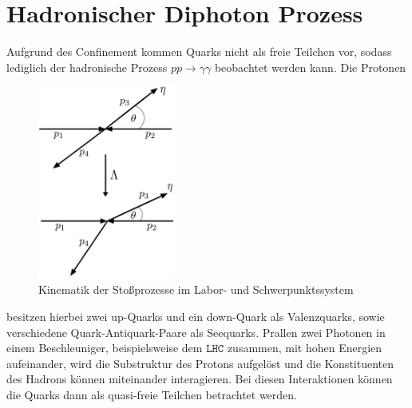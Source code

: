 \section{Hadronischer Diphoton Prozess}
Aufgrund des Confinement kommen Quarks nicht als freie Teilchen vor, sodass lediglich der hadronische Prozess $pp \rightarrow \gamma \gamma$ beobachtet werden kann.  Die Protonen 
\begin{figure}
	\includegraphics[width=45mm]{graphics/Kinematik}
	\caption{Kinematik der Stoßprozesse im Labor- und Schwerpunktssystem}
\end{figure}
besitzen hierbei zwei up-Quarks und ein down-Quark als Valenzquarks, sowie verschiedene Quark-Antiquark-Paare als Seequarks. Prallen zwei Photonen in einem Beschleuniger, beispielsweise dem $\texttt{LHC}$ zusammen, mit hohen Energien aufeinander, wird die Substruktur des Protons aufgelöst und die Konstituenten des Hadrons können miteinander interagieren. Bei diesen Interaktionen können die Quarks dann als quasi-freie Teilchen betrachtet werden.

